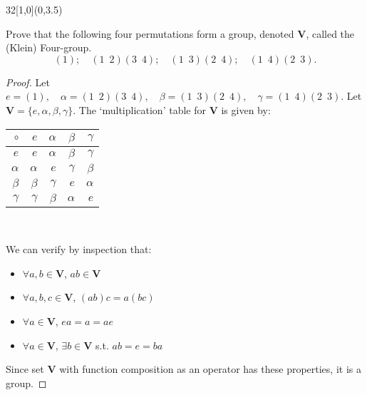 \documentclass[12pt]{article}
\newenvironment{exercise}[2]{\begin{textblock}{32}[1,0](0,#2)\noindent#1\end{textblock}}{\vspace{1in}}
\begin{document}
\newpage

\begin{exercise}{1.36}{3.5}
	{\noindent}Prove that the following four permutations form a group, denoted $\mathbf{V}$, called the \\(Klein) Four-group.
	\[(1);\quad(1\enspace2)(3\enspace4);\quad(1\enspace3)(2\enspace4);\quad(1\enspace4)(2\enspace3).\]
	\bigskip

	\begin{proof}
		Let $e = (1),\quad\alpha=(1\enspace2)(3\enspace4),\quad\beta=(1\enspace3)(2\enspace4),\quad\gamma=(1\enspace4)(2\enspace3)$.
		Let $\mathbf{V} = \{e, \alpha, \beta, \gamma\}$. The `multiplication' table for $\mathbf{V}$ is given by:
		\bigskip

		\setlength{\tabcolsep}{2em} %
		\renewcommand{\arraystretch}{1.25}%
		\begin{tabular}{r|rrrr}
			$\circ$        & $e$      & $\alpha$ & $\beta$  & $\gamma$ \\ \hline
			$e$            & $e$      & $\alpha$ & $\beta$  & $\gamma$ \\
			$\alpha$       & $\alpha$ & $e$      & $\gamma$ & $\beta$  \\
			$\beta$        & $\beta$  & $\gamma$ & $e$      & $\alpha$ \\
			$\gamma$       & $\gamma$ & $\beta$  & $\alpha$ & $e$      \\
		\end{tabular} \\
	\bigskip

	We can verify by inspection that:
	\begin{itemize}
		\item $\forall a,b\in\mathbf{V}$, $ab \in \mathbf{V}$
		\item $\forall a,b,c\in\mathbf{V}$, $(ab)c=a(bc)$
		\item $\forall a\in\mathbf{V}$, $ea=a=ae$ 
		\item $\forall a\in\mathbf{V}$, $\exists b\in\mathbf{V}$ s.t. $ab=e=ba$ \quad[Specifically, $b=a$; \textsc{iow}, every element of $\mathbf{V}$ is its own inverse.]
	\end{itemize}
	Since set $\mathbf{V}$ with function composition as an operator has these properties, it is a group.
	\end{proof}
\end{exercise}
\end{document}
